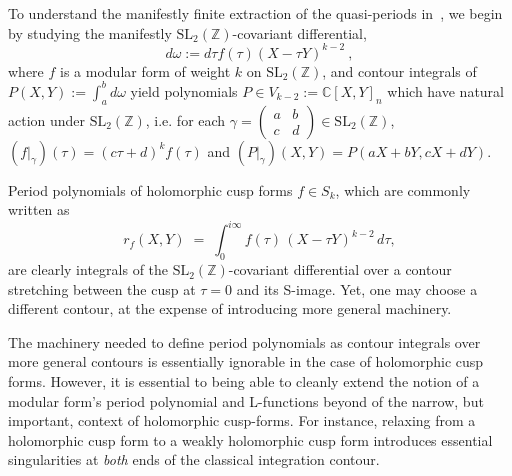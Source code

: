 \documentclass[11pt]{article}
\numberwithin{equation}{section}  %
\newcommand{\ZZ}{\mathbb{Z}}
\newcommand{\CC}{\mathbb{C}}
\newcommand{\SLZ}{\mathrm{SL}_2(\ZZ)}
\begin{document}
To understand the manifestly finite extraction of the quasi-periods in~\cite{Brown2017}, 
we begin by studying the manifestly $\SLZ$-covariant differential,
\begin{equation}
d\omega := d\tau f(\tau) (X - \tau Y)^{k-2}~,
\end{equation}
where $f$ is a modular form of weight $k$ on $\SLZ$, and contour integrals of 
$P(X, Y) := \int_a^b d\omega$ yield polynomials $P \in V_{k-2} := \CC[X, Y]_n$ 
which have natural action under $\SLZ$, i.e. for each $\gamma = \left( 
\begin{smallmatrix} a & b \\ c & d \end{smallmatrix} \right) \in \SLZ$, 
$(f|_\gamma)(\tau) = (c\tau + d)^k f(\tau)$ and $(P|_\gamma)(X, Y) = 
P(a X + b Y, c X + d Y)$.

Period polynomials of holomorphic cusp forms $f \in S_k$, which are commonly 
written as
\begin{equation}\label{eq:classical-rf}
  r_f(X, Y) \;=\; \int_0^{i\infty}\! f(\tau)\,(X - \tau Y)^{k-2}\,d\tau,
\end{equation}
are clearly integrals of the $\SLZ$-covariant differential over a contour 
stretching between the cusp at $\tau = 0$ and its S-image. Yet, one may
choose a different contour, at the expense of introducing more general 
machinery. 

The machinery needed to define period polynomials as contour integrals over 
more general contours is essentially ignorable in the case of holomorphic cusp 
forms. However, it is essential to being able to cleanly extend the notion of a 
modular form's period polynomial and L-functions beyond of the narrow, but 
important, context of holomorphic cusp-forms. For instance, relaxing from a 
holomorphic cusp form to a weakly holomorphic cusp form introduces essential 
singularities at \emph{both} ends of the classical integration contour. 
 
\end{document}
